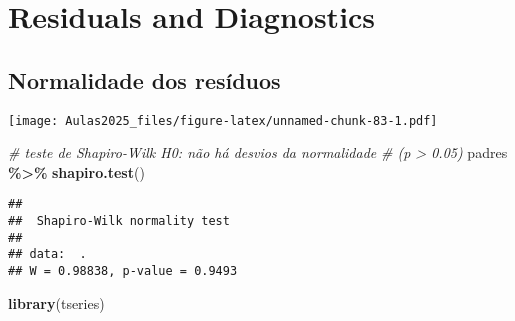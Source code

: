 \documentclass[
]{book}
\newenvironment{Shaded}{\begin{snugshade}}{\end{snugshade}}
\newcommand{\AttributeTok}[1]{\textcolor[rgb]{0.13,0.29,0.53}{#1}}
\newcommand{\CommentTok}[1]{\textcolor[rgb]{0.56,0.35,0.01}{\textit{#1}}}
\newcommand{\ConstantTok}[1]{\textcolor[rgb]{0.56,0.35,0.01}{#1}}
\newcommand{\DecValTok}[1]{\textcolor[rgb]{0.00,0.00,0.81}{#1}}
\newcommand{\FunctionTok}[1]{\textcolor[rgb]{0.13,0.29,0.53}{\textbf{#1}}}
\newcommand{\NormalTok}[1]{#1}
\newcommand{\OtherTok}[1]{\textcolor[rgb]{0.56,0.35,0.01}{#1}}
\newcommand{\SpecialCharTok}[1]{\textcolor[rgb]{0.81,0.36,0.00}{\textbf{#1}}}
\begin{document}
\hypertarget{residuals-and-diagnostics}{%
\section{Residuals and Diagnostics}\label{residuals-and-diagnostics}}

\hypertarget{normalidade-dos-resuxedduos}{%
\subsection{Normalidade dos
resíduos}\label{normalidade-dos-resuxedduos}}

\begin{Shaded}
\end{Shaded}

\texttt{[image: Aulas2025\_files/figure-latex/unnamed-chunk-83-1.pdf]}

\begin{Shaded}
\begin{Highlighting}[]
\CommentTok{\# teste de Shapiro{-}Wilk H0: não há desvios da normalidade}
\CommentTok{\# (p \textgreater{} 0.05)}
\NormalTok{padres }\SpecialCharTok{\%\textgreater{}\%}
    \FunctionTok{shapiro.test}\NormalTok{()}
\end{Highlighting}
\end{Shaded}

\begin{verbatim}
## 
##  Shapiro-Wilk normality test
## 
## data:  .
## W = 0.98838, p-value = 0.9493
\end{verbatim}

\begin{Shaded}
\begin{Highlighting}[]
\FunctionTok{library}\NormalTok{(tseries)}
\end{Highlighting}
\end{Shaded}
\end{document}
